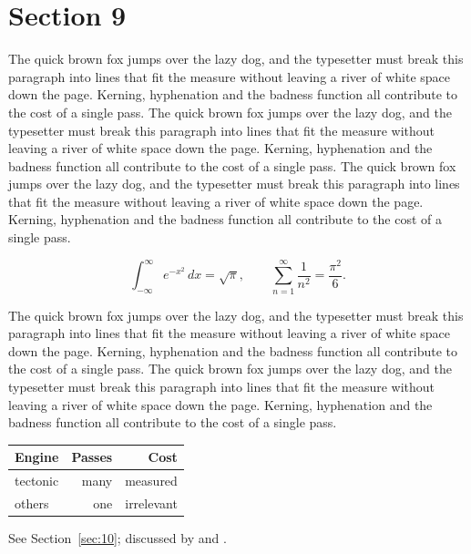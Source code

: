 \documentclass{article}
\begin{document}
\section{Section 9}
\label{sec:9}
The quick brown fox jumps over the lazy dog, and the typesetter must break this paragraph into lines that fit the measure without leaving a river of white space down the page. Kerning, hyphenation and the badness function all contribute to the cost of a single pass. The quick brown fox jumps over the lazy dog, and the typesetter must break this paragraph into lines that fit the measure without leaving a river of white space down the page. Kerning, hyphenation and the badness function all contribute to the cost of a single pass. The quick brown fox jumps over the lazy dog, and the typesetter must break this paragraph into lines that fit the measure without leaving a river of white space down the page. Kerning, hyphenation and the badness function all contribute to the cost of a single pass. 

\begin{equation}\label{eq:9}
\int_{-\infty}^{\infty} e^{-x^{2}}\,dx = \sqrt{\pi}, \qquad
\sum_{n=1}^{\infty} \frac{1}{n^{2}} = \frac{\pi^{2}}{6}.
\end{equation}

The quick brown fox jumps over the lazy dog, and the typesetter must break this paragraph into lines that fit the measure without leaving a river of white space down the page. Kerning, hyphenation and the badness function all contribute to the cost of a single pass. The quick brown fox jumps over the lazy dog, and the typesetter must break this paragraph into lines that fit the measure without leaving a river of white space down the page. Kerning, hyphenation and the badness function all contribute to the cost of a single pass. 

\begin{center}
\begin{tabular}{lrr}
\toprule
Engine & Passes & Cost \\
\midrule
tectonic & many & measured \\
others & one & irrelevant \\
\bottomrule
\end{tabular}
\end{center}

See Section~\ref{sec:10}; discussed by \textcite{k5} and \textcite{l2}.
\end{document}

